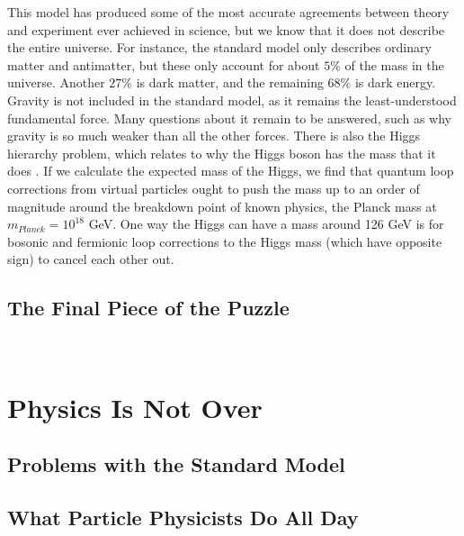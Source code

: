 This model has produced some of the most accurate agreements between theory and experiment ever achieved in science, but we know that it does not describe the entire universe. For instance, the standard model only describes ordinary matter and antimatter, but these only account for about $5\%$ of the mass in the universe. Another $27\%$ is dark matter, and the remaining $68\%$ is dark energy. Gravity is not included in the standard model, as it remains the least-understood fundamental force. Many questions about it remain to be answered, such as why gravity is so much weaker than all the other forces. There is also the Higgs hierarchy problem, which relates to why the Higgs boson has the mass that it does \cite{hierarchy}. If we calculate the expected mass of the Higgs, we find that quantum loop corrections from virtual particles ought to push the mass up to an order of magnitude around the breakdown point of known physics, the Planck mass at $m_{Planck} = 10^{18}$ GeV. One way the Higgs can have a mass around 126 GeV is for bosonic and fermionic loop corrections to the Higgs mass (which have opposite sign) to cancel each other out.

\subsection{The Final Piece of the Puzzle}

~\cite{Griffiths}

\section{Physics Is Not Over}

\subsection{Problems with the Standard Model}

\subsection{What Particle Physicists Do All Day}